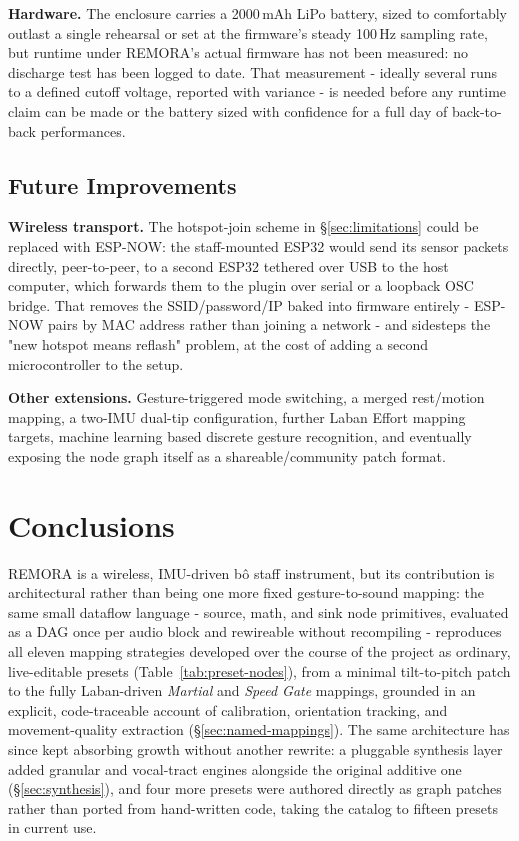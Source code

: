 \documentclass[sigconf,nonacm]{acmart}
\newcommand{\preset}[1]{\textit{#1}}
\begin{document}
\textbf{Hardware.} The enclosure carries a 2000\,mAh LiPo battery, sized to comfortably outlast a
single rehearsal or set at the firmware's steady 100\,Hz sampling rate, but runtime under REMORA's
actual firmware has not been measured: no discharge test has been logged to date. That measurement
- ideally several runs to a defined cutoff voltage, reported with variance - is needed before any
runtime claim can be made or the battery sized with confidence for a full day of back-to-back
performances.

\subsection{Future Improvements}

\textbf{Wireless transport.} The hotspot-join scheme in \S\ref{sec:limitations} could be replaced
with ESP-NOW: the staff-mounted ESP32 would send its sensor packets directly, peer-to-peer, to a
second ESP32 tethered over USB to the host computer, which forwards them to the plugin over serial
or a loopback OSC bridge. That removes the SSID/password/IP baked into firmware entirely - ESP-NOW
pairs by MAC address rather than joining a network - and sidesteps the "new
hotspot means reflash"
problem, at the cost of adding a second microcontroller to the setup.

\textbf{Other extensions.} Gesture-triggered mode switching, a merged rest/motion mapping, a two-IMU
dual-tip configuration, further Laban Effort mapping targets, machine learning based discrete
gesture recognition,
and eventually exposing the node graph itself as a shareable/community patch format.

\section{Conclusions}
REMORA is a wireless, IMU-driven b\^o staff instrument, but its contribution is architectural rather
than being one more fixed gesture-to-sound mapping: the same small dataflow language - source,
math, and sink node primitives, evaluated as a DAG once per audio block and rewireable without
recompiling - reproduces all eleven mapping strategies developed over the course of the project as
ordinary, live-editable presets (Table~\ref{tab:preset-nodes}), from a minimal tilt-to-pitch patch to the fully
Laban-driven \preset{Martial} and \preset{Speed Gate} mappings, grounded in an explicit, code-traceable account of
calibration, orientation tracking, and movement-quality extraction (\S\ref{sec:named-mappings}). The
same architecture has since kept absorbing growth without another rewrite: a pluggable synthesis
layer added granular and vocal-tract engines alongside the original additive one
(\S\ref{sec:synthesis}), and four more presets were authored directly as graph patches rather than
ported from hand-written code, taking the catalog to fifteen presets in current use.
\end{document}
